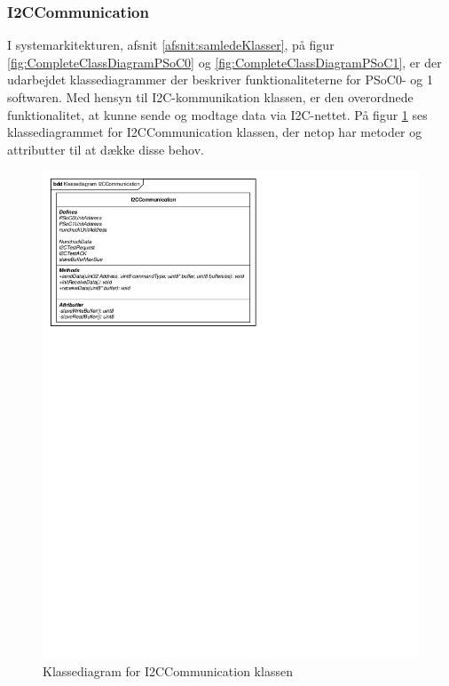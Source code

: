\subsubsection{I2CCommunication}
\label{afsnit:I2Ccommunication}
I systemarkitekturen, afsnit \ref{afsnit:samledeKlasser}, på figur \ref{fig:CompleteClassDiagramPSoC0} og \ref{fig:CompleteClassDiagramPSoC1}, er der udarbejdet klassediagrammer der beskriver funktionaliteterne for PSoC0- og 1 softwaren.  Med hensyn til I2C-kommunikation klassen, er den overordnede funktionalitet, at kunne sende og modtage data via I2C-nettet. På figur \ref{figure:klassediagramI2CCommunication} ses klassediagrammet for I2CCommunication klassen, der netop har metoder og attributter til at dække disse behov.

\begin{figure}[H]
	\centering
	\includegraphics[]{DesignOgImplementering/images/I2CCommunication}
	\caption{Klassediagram for I2CCommunication klassen}
	\label{figure:klassediagramI2CCommunication}
\end{figure}


